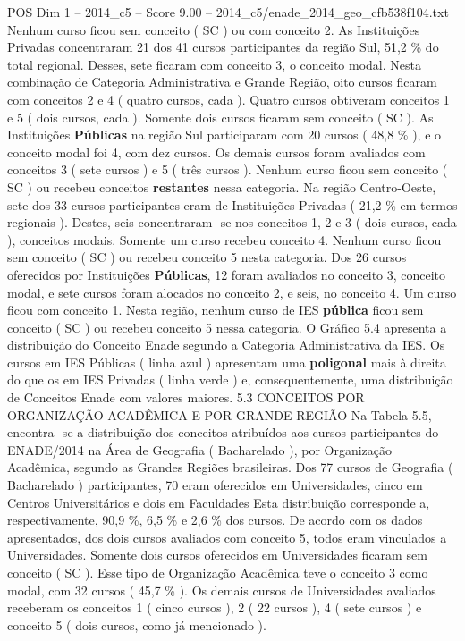 \begin{textsample}{POS Dim 1 – 2014\_c5 – Score 9.00 – 2014\_c5/enade\_2014\_geo\_cfb538f104.txt}
Nenhum curso ficou sem conceito ( SC ) ou com conceito 2.
As Instituições Privadas concentraram 21 dos 41 cursos participantes da região Sul, 51,2 \% do total regional.
Desses, sete ficaram com conceito 3, o conceito modal.
Nesta combinação de Categoria Administrativa e Grande Região, oito cursos ficaram com conceitos 2 e 4 ( quatro cursos, cada ).
Quatro cursos obtiveram conceitos 1 e 5 ( dois cursos, cada ).
Somente dois cursos ficaram sem conceito ( SC ).
As Instituições \textbf{Públicas} na região Sul participaram com 20 cursos ( 48,8 \% ), e o conceito modal foi 4, com dez cursos.
Os demais cursos foram avaliados com conceitos 3 ( sete cursos ) e 5 ( três cursos ).
Nenhum curso ficou sem conceito ( SC ) ou recebeu conceitos \textbf{restantes} nessa categoria.
Na região Centro-Oeste, sete dos 33 cursos participantes eram de Instituições Privadas ( 21,2 \% em termos regionais ).
Destes, seis concentraram -se nos conceitos 1, 2 e 3 ( dois cursos, cada ), conceitos modais.
Somente um curso recebeu conceito 4.
Nenhum curso ficou sem conceito ( SC ) ou recebeu conceito 5 nesta categoria.
Dos 26 cursos oferecidos por Instituições \textbf{Públicas}, 12 foram avaliados no conceito 3, conceito modal, e sete cursos foram alocados no conceito 2, e seis, no conceito 4.
Um curso ficou com conceito 1.
Nesta região, nenhum curso de IES \textbf{pública} ficou sem conceito ( SC ) ou recebeu conceito 5 nessa categoria.
O Gráfico 5.4 apresenta a distribuição do Conceito Enade segundo a Categoria Administrativa da IES.
Os cursos em IES Públicas ( linha azul ) apresentam uma \textbf{poligonal} mais à direita do que os em IES Privadas ( linha verde ) e, consequentemente, uma distribuição de Conceitos Enade com valores maiores. 5.3 CONCEITOS POR ORGANIZAÇÃO ACADÊMICA E POR GRANDE REGIÃO Na Tabela 5.5, encontra -se a distribuição dos conceitos atribuídos aos cursos participantes do ENADE/2014 na Área de Geografia ( Bacharelado ), por Organização Acadêmica, segundo as Grandes Regiões brasileiras.
Dos 77 cursos de Geografia ( Bacharelado ) participantes, 70 eram oferecidos em Universidades, cinco em Centros Universitários e dois em Faculdades Esta distribuição corresponde a, respectivamente, 90,9 \%, 6,5 \% e 2,6 \% dos cursos.
De acordo com os dados apresentados, dos dois cursos avaliados com conceito 5, todos eram vinculados a Universidades.
Somente dois cursos oferecidos em Universidades ficaram sem conceito ( SC ).
Esse tipo de Organização Acadêmica teve o conceito 3 como modal, com 32 cursos ( 45,7 \% ).
Os demais cursos de Universidades avaliados receberam os conceitos 1 ( cinco cursos ), 2 ( 22 cursos ), 4 ( sete cursos ) e conceito 5 ( dois cursos, como já mencionado ).

\end{textsample}
